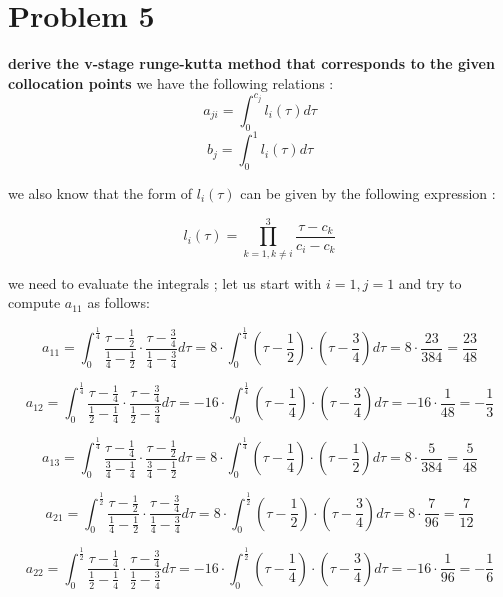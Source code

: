 \documentclass[12pt,letterpaper]{article}
\begin{document}
\section*{Problem 5}

\textbf{derive the v-stage runge-kutta method that corresponds to the given collocation points}
\newline
\newline
we have the following relations : 
\[ a_{ji} = \int_{0}^{c_j} l_i(\tau)d\tau\]
\[b_j = \int_{0}^{1} l_i(\tau)d\tau \]

we also know that the form of $l_i(\tau)$ can be given by the following expression : 

\[l_i(\tau) = \prod_{k = 1, k \not= i}^{3} \frac{\tau - c_k}{c_i - c_k}\]

we need to evaluate the integrals ; let us start with $i=1, j=1$  and try to compute $a_{11}$ as follows:

\[ a_{11} = \int_{0}^{\frac{1}{4}} \frac{\tau-\frac{1}{2}}{\frac{1}{4} - \frac{1}{2}} \cdot  \frac{\tau-\frac{3}{4}}{\frac{1}{4} - \frac{3}{4}}d\tau = 8 \cdot \int_{0}^{\frac{1}{4}} \left(\tau-\frac{1}{2}\right) \cdot  \left(\tau-\frac{3}{4}\right) d\tau = 8 \cdot \frac{23}{384} = \frac{23}{48} \]

\[ a_{12} = \int_{0}^{\frac{1}{4}} \frac{\tau-\frac{1}{4}}{\frac{1}{2} - \frac{1}{4}} \cdot  \frac{\tau-\frac{3}{4}}{\frac{1}{2} - \frac{3}{4}}d\tau = -16 \cdot \int_{0}^{\frac{1}{4}} \left(\tau-\frac{1}{4}\right) \cdot  \left(\tau-\frac{3}{4}\right) d\tau = -16 \cdot \frac{1}{48} = -\frac{1}{3} \]

\[ a_{13} = \int_{0}^{\frac{1}{4}} \frac{\tau-\frac{1}{4}}{\frac{3}{4} - \frac{1}{4}} \cdot  \frac{\tau-\frac{1}{2}}{\frac{3}{4} - \frac{1}{2}}d\tau = 8 \cdot \int_{0}^{\frac{1}{4}} \left(\tau-\frac{1}{4}\right) \cdot  \left(\tau-\frac{1}{2}\right) d\tau = 8 \cdot \frac{5}{384} = \frac{5}{48} \]

\[ a_{21} = \int_{0}^{\frac{1}{2}} \frac{\tau-\frac{1}{2}}{\frac{1}{4} - \frac{1}{2}} \cdot  \frac{\tau-\frac{3}{4}}{\frac{1}{4} - \frac{3}{4}}d\tau = 8 \cdot \int_{0}^{\frac{1}{2}} \left(\tau-\frac{1}{2}\right) \cdot  \left(\tau-\frac{3}{4}\right) d\tau = 8 \cdot \frac{7}{96} = \frac{7}{12} \]

\[ a_{22} = \int_{0}^{\frac{1}{2}} \frac{\tau-\frac{1}{4}}{\frac{1}{2} - \frac{1}{4}} \cdot  \frac{\tau-\frac{3}{4}}{\frac{1}{2} - \frac{3}{4}}d\tau = -16 \cdot \int_{0}^{\frac{1}{2}} \left(\tau-\frac{1}{4}\right) \cdot  \left(\tau-\frac{3}{4}\right) d\tau = -16 \cdot \frac{1}{96} = -\frac{1}{6} \]
\end{document}
